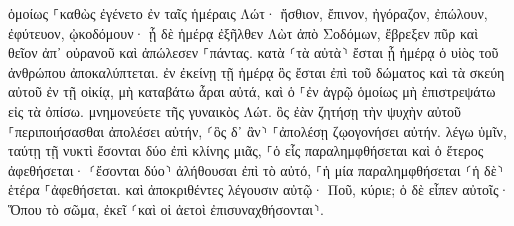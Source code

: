 \documentclass[twoside, 9pt]{extreport}
\begin{document}
ὁμοίως ⸀καθὼς ἐγένετο ἐν ταῖς ἡμέραις Λώτ· ἤσθιον, ἔπινον, ἠγόραζον, ἐπώλουν, ἐφύτευον, ᾠκοδόμουν· 
ᾗ δὲ ἡμέρᾳ ἐξῆλθεν Λὼτ ἀπὸ Σοδόμων, ἔβρεξεν πῦρ καὶ θεῖον ἀπ᾽ οὐρανοῦ καὶ ἀπώλεσεν ⸀πάντας. 
κατὰ ⸂τὰ αὐτὰ⸃ ἔσται ᾗ ἡμέρᾳ ὁ υἱὸς τοῦ ἀνθρώπου ἀποκαλύπτεται. 
ἐν ἐκείνῃ τῇ ἡμέρᾳ ὃς ἔσται ἐπὶ τοῦ δώματος καὶ τὰ σκεύη αὐτοῦ ἐν τῇ οἰκίᾳ, μὴ καταβάτω ἆραι αὐτά, καὶ ὁ ⸀ἐν ἀγρῷ ὁμοίως μὴ ἐπιστρεψάτω εἰς τὰ ὀπίσω. 
μνημονεύετε τῆς γυναικὸς Λώτ. 
ὃς ἐὰν ζητήσῃ τὴν ψυχὴν αὐτοῦ ⸀περιποιήσασθαι ἀπολέσει αὐτήν, ⸂ὃς δ᾽ ἂν⸃ ⸀ἀπολέσῃ ζῳογονήσει αὐτήν. 
λέγω ὑμῖν, ταύτῃ τῇ νυκτὶ ἔσονται δύο ἐπὶ κλίνης μιᾶς, ⸀ὁ εἷς παραλημφθήσεται καὶ ὁ ἕτερος ἀφεθήσεται· 
⸂ἔσονται δύο⸃ ἀλήθουσαι ἐπὶ τὸ αὐτό, ⸀ἡ μία παραλημφθήσεται ⸂ἡ δὲ⸃ ἑτέρα ⸀ἀφεθήσεται. 
καὶ ἀποκριθέντες λέγουσιν αὐτῷ· Ποῦ, κύριε; ὁ δὲ εἶπεν αὐτοῖς· Ὅπου τὸ σῶμα, ἐκεῖ ⸂καὶ οἱ ἀετοὶ ἐπισυναχθήσονται⸃. 
\end{document}
